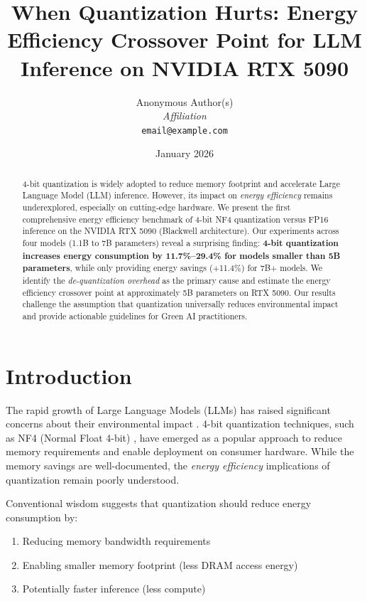 \documentclass[11pt]{article}
\title{When Quantization Hurts: Energy Efficiency Crossover Point for LLM Inference on NVIDIA RTX 5090}
\author{
  Anonymous Author(s)\\
  \textit{Affiliation}\\
  \texttt{email@example.com}
}
\date{January 2026}
\begin{document}
\maketitle

\begin{abstract}
4-bit quantization is widely adopted to reduce memory footprint and accelerate Large Language Model (LLM) inference. However, its impact on \textit{energy efficiency} remains underexplored, especially on cutting-edge hardware. We present the first comprehensive energy efficiency benchmark of 4-bit NF4 quantization versus FP16 inference on the NVIDIA RTX 5090 (Blackwell architecture). Our experiments across four models (1.1B to 7B parameters) reveal a surprising finding: \textbf{4-bit quantization increases energy consumption by 11.7\%--29.4\% for models smaller than 5B parameters}, while only providing energy savings (+11.4\%) for 7B+ models. We identify the \textit{de-quantization overhead} as the primary cause and estimate the energy efficiency crossover point at approximately 5B parameters on RTX 5090. Our results challenge the assumption that quantization universally reduces environmental impact and provide actionable guidelines for Green AI practitioners.
\end{abstract}

\section{Introduction}

The rapid growth of Large Language Models (LLMs) has raised significant concerns about their environmental impact \cite{strubell2019energy, patterson2021carbon}. 4-bit quantization techniques, such as NF4 (Normal Float 4-bit) \cite{dettmers2023qlora}, have emerged as a popular approach to reduce memory requirements and enable deployment on consumer hardware. While the memory savings are well-documented, the \textit{energy efficiency} implications of quantization remain poorly understood.

Conventional wisdom suggests that quantization should reduce energy consumption by:
\begin{enumerate}
    \item Reducing memory bandwidth requirements
    \item Enabling smaller memory footprint (less DRAM access energy)
    \item Potentially faster inference (less compute)
\end{enumerate}
\end{document}
